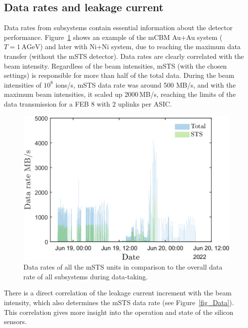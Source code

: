\subsection{Data rates and leakage current}
Data rates from subsystems contain essential information about the detector performance. Figure~\ref{fig_data_rates_Ag} shows an example of the \gls{mCBM} Au+Au system ($T= 1\,\mathrm{AGeV}$) and later with Ni+Ni system, due to reaching the maximum data transfer (without the \gls{mSTS} detector). Data rates are clearly correlated with the beam intensity. Regardless of the beam intensities, \gls{mSTS} (with the chosen settings) is responsible for more than half of the total data. During the beam intensities of $10^{8}$ ions/s, \gls{mSTS} data rate was around 500 MB/s, and with the maximum beam intensities, it scaled up $2000$\,MB/s, reaching the limits of the data transmission for a \gls{FEB} $8$ with $2$ uplinks per \gls{ASIC}. 
\begin{figure}[H]
\centering
\includegraphics[width=0.6\columnwidth]{Chapter6/DCS/images/rates/Ag_total.png}
\caption{Data rates of all the \gls{mSTS} units in comparison to the overall data rate of all subsystems during data-taking.}
\label{fig_data_rates_Ag}
\end{figure}
There is a direct correlation of the leakage current increment with the beam intensity, which also determines the \gls{mSTS} data rate (see Figure~\ref{fig_Data}). This correlation gives more insight into the operation and state of the silicon sensors.
